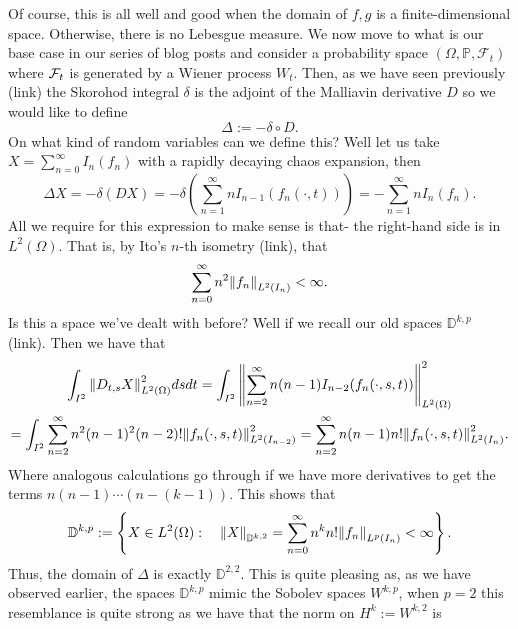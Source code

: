 \documentclass[12pt]{article}
\begin{document}
\begin{CJK*}{UTF8}{gbsn}
	Of course, this is all well and good when the domain of $f,g$ is a finite-dimensional space. Otherwise, there is no Lebesgue measure.	We now move to what is our base case in our series of blog posts and consider a probability space $(\Omega,\mathbb{P},\mathcal{F}_t)$ where $\mathcal{F}_t$ is generated by a Wiener process $W_t$. Then, as we have seen previously (link)
	the Skorohod integral $\delta $ is the adjoint of the Malliavin derivative $D$ so we would like to define
	\begin{equation*}
		\Delta  := -\delta \circ D.
	\end{equation*}
	On what kind of random variables can we define this? Well let us take $X=\sum_{n=0}^{\infty}  I_n(f_n)$ with a rapidly decaying chaos expansion, then
	\begin{equation*}
		\Delta X=-\delta (DX)=-\delta \left(\sum_{n=1}^\infty nI_{n-1}(f_n(\cdot ,t))\right)=-\sum_{n=1}^\infty nI_{n}(f_n).
	\end{equation*}
	All we require for this expression to make sense is that- the right-hand side is in $L^2(\Omega)$. That is, by Ito's $n$-th isometry (link), that
	\begin{equation*}
		\sum_{n=0}^\infty n^2 \norm{f_n}_{L^2(I_n)}< \infty.
	\end{equation*}
	Is this a space we've dealt with before? Well if we recall our old spaces $\mathbb{D}^{k,p}$  (link). Then we have that
	\begin{multline*}
		\int_{I^2}\norm{D_{t,s}X}_{L^2(\Omega)}^2 ds d t=\int_{I^2}\norm{\sum_{n=2}^\infty n(n-1)I_{n-2}(f_n(\cdot ,s,t))}_{L^2(\Omega)}^2\\=\int_{I^2}\sum_{n=2}^\infty n^2(n-1)^2(n-2)!\norm{f_n(\cdot ,s,t)}_{L^2(I_{n-2})}^2=\sum_{n=2}^\infty n(n-1)n!\norm{f_n(\cdot ,s,t)}_{L^2(I_n)}^2.
	\end{multline*}
	Where analogous calculations go through if we have more derivatives to get the terms $n(n-1)\cdots (n-(k-1))$. This shows that
	\begin{equation*}
		\mathbb{D}^{k,p}:=\left\{X\in L^2(\Omega):\quad \norm{X}_{\mathbb{D}^{k,2}}=\sum_{n=0}^\infty n^kn! \norm{f_n}_{L^p(I_n)}< \infty\right\} .
	\end{equation*}
	Thus, the domain of $\Delta $ is exactly  $\mathbb{D}^{2,2}$. This is quite pleasing as, as we have observed earlier, the spaces $\mathbb{D}^{k,p}$ mimic the Sobolev spaces $W^{k,p}$, when $p=2$ this resemblance is quite strong
	as we have that the norm on  $H^k:=W^{k,2}$ is
	\begin{equation*}

\end{equation*}
\end{CJK*}
\end{document}
